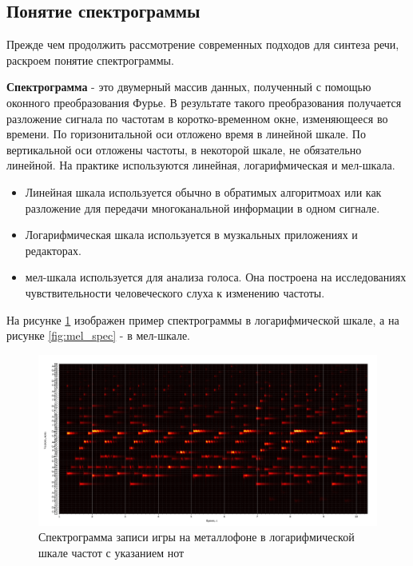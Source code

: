 \subsection{Понятие спектрограммы}
Прежде чем продолжить рассмотрение современных подходов для синтеза речи, раскроем понятие спектрограммы.

\textbf{Спектрограмма} - это двумерный массив данных, полученный с помощью оконного преобразования Фурье. 
В результате такого преобразования получается разложение сигнала по частотам в коротко-временном окне, изменяющееся во времени.
По горизонитальной оси отложено время в линейной шкале. По вертикальной оси отложены частоты, в некоторой шкале, не обязательно линейной.
На практике используются линейная, логарифмическая и мел-шкала.
\begin{itemize}
  \item Линейная шкала используется обычно в обратимых алгоритмоах или как разложение для передачи многоканальной информации в одном сигнале.
  \item Логарифмическая шкала используется в музкальных приложениях и редакторах.
  \item мел-шкала используется для анализа голоса. Она построена на исследованиях чувствительности человеческого слуха к изменению частоты.
\end{itemize}

На рисунке \ref{fig:log_spec} изображен пример спектрограммы в логарифмической шкале, а на рисунке \ref{fig:mel_spec} - в мел-шкале.
\begin{figure}[t]
  \centering
  \includegraphics[width=16cm]{figures/log_spec}
  \caption{Спектрограмма записи игры на металлофоне в логарифмической шкале частот с указанием нот}
  \label{fig:log_spec}
\end{figure}

